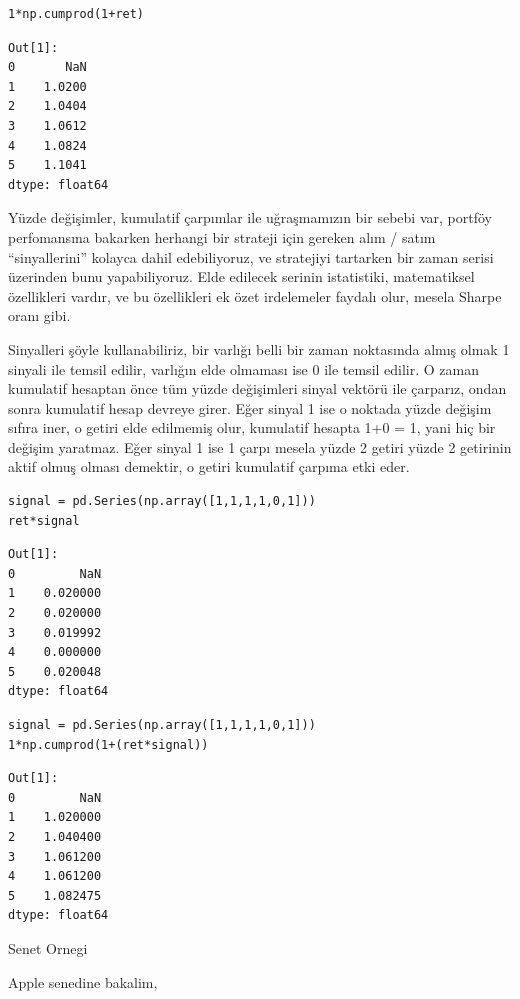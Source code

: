 \documentclass[12pt,fleqn]{article}\usepackage{../../common}
\begin{document}
\begin{verbatim}
1*np.cumprod(1+ret)
\end{verbatim}

\begin{verbatim}
Out[1]: 
0       NaN
1    1.0200
2    1.0404
3    1.0612
4    1.0824
5    1.1041
dtype: float64
\end{verbatim}

Yüzde değişimler, kumulatif çarpımlar ile uğraşmamızın bir sebebi var, portföy
perfomansına bakarken herhangi bir strateji için gereken alım / satım
``sinyallerini'' kolayca dahil edebiliyoruz, ve stratejiyi tartarken bir zaman
serisi üzerinden bunu yapabiliyoruz. Elde edilecek serinin istatistiki,
matematiksel özellikleri vardır, ve bu özellikleri ek özet irdelemeler
faydalı olur, mesela Sharpe oranı gibi.

Sinyalleri şöyle kullanabiliriz, bir varlığı belli bir zaman noktasında almış
olmak 1 sinyali ile temsil edilir, varlığın elde olmaması ise 0 ile temsil
edilir.  O zaman kumulatif hesaptan önce tüm yüzde değişimleri sinyal vektörü
ile çarparız, ondan sonra kumulatif hesap devreye girer. Eğer sinyal 1 ise o
noktada yüzde değişim sıfıra iner, o getiri elde edilmemiş olur, kumulatif
hesapta 1+0 = 1, yani hiç bir değişim yaratmaz. Eğer sinyal 1 ise 1 çarpı mesela
yüzde 2 getiri yüzde 2 getirinin aktif olmuş olması demektir, o getiri kumulatif
çarpıma etki eder.

\begin{verbatim}
signal = pd.Series(np.array([1,1,1,1,0,1]))
ret*signal
\end{verbatim}

\begin{verbatim}
Out[1]: 
0         NaN
1    0.020000
2    0.020000
3    0.019992
4    0.000000
5    0.020048
dtype: float64
\end{verbatim}

\begin{verbatim}
signal = pd.Series(np.array([1,1,1,1,0,1]))
1*np.cumprod(1+(ret*signal))
\end{verbatim}

\begin{verbatim}
Out[1]: 
0         NaN
1    1.020000
2    1.040400
3    1.061200
4    1.061200
5    1.082475
dtype: float64
\end{verbatim}

Senet Ornegi

Apple senedine bakalim,
\end{document}

